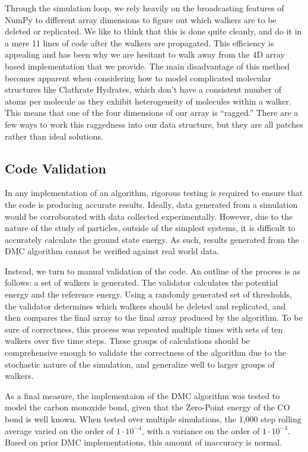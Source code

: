 \documentclass[journal=jacsat,manuscript=article]{achemso}
\begin{document}
Through the simulation loop, we rely heavily on the broadcasting features of NumPy to different array dimensions to figure out which walkers are to be deleted or replicated. We like to think that this is done quite cleanly, and do it in a mere 11 lines of code after the walkers are propagated. This efficiency is appealing and has been why we are hesitant to walk away from the 4D array based implementation that we provide. The main disadvantage of this method becomes apparent when considering how to model complicated molecular structures like Clathrate Hydrates, which don't have a consistent number of atoms per molecule as they exhibit heterogeneity of molecules within a walker. This means that one of the four dimensions of our array is ``ragged.'' There are a few ways to work this raggedness into our data structure, but they are all patches rather than ideal solutions.
\subsection{Code Validation}

In any implementation of an algorithm, rigorous testing is required to ensure that the code is producing accurate results. Ideally, data generated from a simulation would be corroborated with data collected experimentally. However, due to the nature of the study of particles, outside of the simplest systems, it is difficult to accurately calculate the ground state energy. As such, results generated from the DMC algorithm cannot be verified against real world data. 

Instead, we turn to manual validation of the code. An outline of the process is as follows: a set of walkers is generated. The validator calculates the potential energy and the reference energy. Using a randomly generated set of thresholds, the validator determines which walkers should be deleted and replicated, and then compares the final array to the final array produced by the algorithm. To be sure of correctness, this process was repeated multiple times with sets of ten walkers over five time steps. These groups of calculations should be comprehensive enough to validate the correctness of the algorithm due to the stochastic nature of the simulation, and generalize well to larger groups of walkers. 

As a final measure, the implementaion of the DMC algorithm was tested to model the carbon monoxide bond, given that the Zero-Point energy of the CO bond is well known. When tested over multiple simulations, the 1,000 step rolling average varied on the order of  $1\cdot10^{-4}$, with a variance on the order of $1\cdot10^{-3}$. Based on prior DMC implementations, this amount of inaccuracy is normal.  
\end{document}
